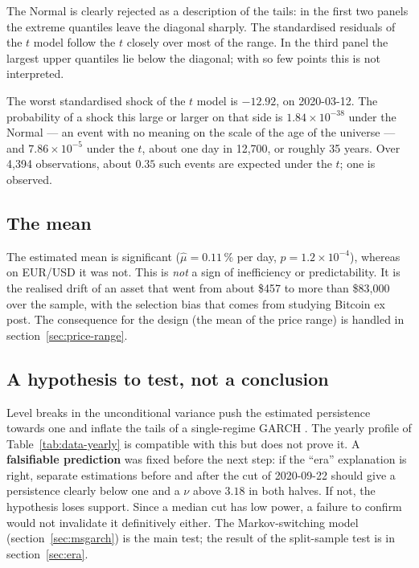 \documentclass[12pt,a4paper]{article}
\begin{document}
The Normal is clearly rejected as a description of the tails: in the first two panels the extreme quantiles leave the diagonal sharply. The standardised residuals of the $t$ model follow the $t$ closely over most of the range. In the third panel the largest upper quantiles lie below the diagonal; with so few points this is not interpreted.

The worst standardised shock of the $t$ model is $-12.92$, on 2020-03-12. The probability of a shock this large or larger on that side is $1.84\times10^{-38}$ under the Normal --- an event with no meaning on the scale of the age of the universe --- and $7.86\times10^{-5}$ under the $t$, about one day in 12,700, or roughly 35 years. Over 4,394 observations, about $0.35$ such events are expected under the $t$; one is observed.

\subsection{The mean}

The estimated mean is significant ($\hat\mu = 0.11\,\%$ per day, $p = 1.2\times10^{-4}$), whereas on EUR/USD it was not. This is \emph{not} a sign of inefficiency or predictability. It is the realised drift of an asset that went from about \$457 to more than \$83,000 over the sample, with the selection bias that comes from studying Bitcoin ex post. The consequence for the design (the mean of the price range) is handled in section~\ref{sec:price-range}.

\subsection{A hypothesis to test, not a conclusion}

Level breaks in the unconditional variance push the estimated persistence towards one and inflate the tails of a single-regime GARCH \citep{lamoureuxlastrapes1990}. The yearly profile of Table~\ref{tab:data-yearly} is compatible with this but does not prove it. A \textbf{falsifiable prediction} was fixed before the next step: if the ``era'' explanation is right, separate estimations before and after the cut of 2020-09-22 should give a persistence clearly below one and a $\nu$ above $3.18$ in both halves. If not, the hypothesis loses support. Since a median cut has low power, a failure to confirm would not invalidate it definitively either. The Markov-switching model (section~\ref{sec:msgarch}) is the main test; the result of the split-sample test is in section~\ref{sec:era}.
\end{document}

